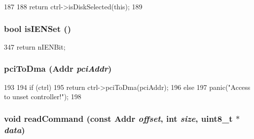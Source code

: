 \begin{DoxyCode}
187 {
188     return ctrl->isDiskSelected(this);
189 }
\end{DoxyCode}
\hypertarget{classIdeDisk_a3e0ad2d309fc4a7aaa7a8af8b09d2cc0}{
\subsubsection[{isIENSet}]{\setlength{\rightskip}{0pt plus 5cm}bool isIENSet ()}}
\label{classIdeDisk_a3e0ad2d309fc4a7aaa7a8af8b09d2cc0}



\begin{DoxyCode}
347 { return nIENBit; }
\end{DoxyCode}
\hypertarget{classIdeDisk_a8f2f46748053f3f3686a295cb3552ecd}{
\subsubsection[{pciToDma}]{ pciToDma ({\bf Addr} {\em pciAddr})}}
\label{classIdeDisk_a8f2f46748053f3f3686a295cb3552ecd}



\begin{DoxyCode}
193 {
194     if (ctrl)
195         return ctrl->pciToDma(pciAddr);
196     else
197         panic("Access to unset controller!\n");
198 }
\end{DoxyCode}
\hypertarget{classIdeDisk_acf65df6ca6cb788da5cc36454d47cc34}{
\subsubsection[{readCommand}]{\setlength{\rightskip}{0pt plus 5cm}void readCommand (const {\bf Addr} {\em offset}, \/  int {\em size}, \/  uint8\_\-t $\ast$ {\em data})}}
\label{classIdeDisk_acf65df6ca6cb788da5cc36454d47cc34}



